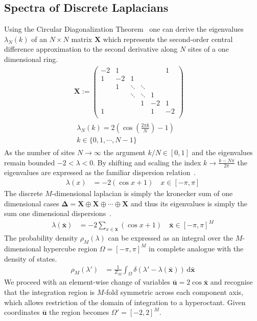 \documentclass{article}[12pt]
\numberwithin{equation}{section}
\begin{document}
\subsection{Spectra of Discrete Laplacians}
Using the Circular Diagonalization Theorem~\cite{} one can derive the
eigenvalues $\lambda_N(k)$ of an $N\times N$ matrix $\mathbf X$ which
represents the second-order central difference approximation to the
second derivative along $N$ sites of a one dimensional ring.
\begin{align}
  \mathbf X :=
  \begin{pmatrix}
    -2 & 1 &  &  &  & 1 \\
    1 & -2 & 1 &  &  &  \\
    & 1 & \ddots & \ddots &  & \\
    & & \ddots & \ddots & 1 & \\
    & & & 1 & -2 & 1 \\
    1 & & & & 1 & -2 \\
  \end{pmatrix}\\
  \begin{matrix}
    \lambda_N(k)=2\left(\cos\left(\frac{2\pi k}{N}\right)-1\right) \\
    k\in\{0,1,\cdots,N-1\}
  \end{matrix}
  \qquad
\end{align}
As the number of sites $N\rightarrow\infty$ the argument $k/N\in[0,1]$
and the eigenvalues remain bounded $-2<\lambda<0$. By shifting and scaling
the index $k\rightarrow\frac{k-N\pi}{2\pi}$ the eigenvalues are expressed as
the familiar dispersion relation~\cite{}.
\begin{align}
  \lambda(x)&=
  -2\left(\cos x+1\right)
  \quad x\in[-\pi,\pi]
\end{align}
The discrete $M$-dimensional laplacian is simply the kronecker sum of one
dimensional cases $\mathbf\Delta=\mathbf X\oplus\mathbf X\oplus\cdots\oplus\mathbf X$
and thus its eigenvalues is simply the sum one dimensional dispersions~\cite{}.
\begin{align}
  \lambda(\bar{\mathbf{x}})&=
  -2\sum_{x\in\bar{\mathbf{x}}}\left(\cos x+1\right)
  \quad \bar{\mathbf{x}}\in[-\pi,\pi]^M
\end{align}
The probability density $\rho_M(\lambda)$ can be expressed as an integral
over the $M$-dimensional hypercube region $\Omega=[-\pi,\pi]^M$ in complete
analogue with the density of states.
\begin{align*}
  \rho_M(\lambda')&=\frac{1}{Z_M}\int_{\Omega}\!\delta(\lambda'-\lambda(\bar{\mathbf{x}}))\,\mathrm{d}\bar{\mathbf{x}}
\end{align*}
We proceed with an element-wise change of variables $\bar{\mathbf{u}}=2\cos \bar{\mathbf{x}}$ and
recognise that the integration region is $M$-fold symmetric across each
component axis, which allows restriction of the domain of integration to a
hyperoctant. Given coordinates $\bar{\mathbf{u}}$ the region becomes $\Omega'=[-2,2]^M$.
\end{document}
